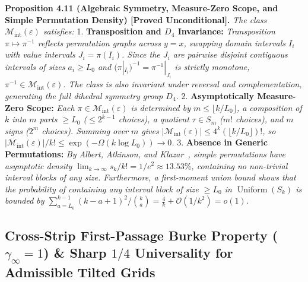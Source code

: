 \documentclass[
  11pt,
]{article}
\begin{document}
\textbf{Proposition 4.11 (Algebraic Symmetry, Measure-Zero Scope, and Simple Permutation Density) [Proved Unconditional].} \emph{The class
\(\mathcal{M}_{\mathrm{int}}(\varepsilon)\) satisfies:} 1.
\textbf{Transposition and \(D_4\) Invariance:} \emph{Transposition
\(\pi \mapsto \pi^{-1}\) reflects permutation graphs across \(y = x\),
swapping domain intervals \(I_i\) with value intervals
\(J_i = \pi(I_i)\). Since the \(J_i\) are pairwise disjoint contiguous
intervals of sizes \(a_i \ge L_0\) and
\((\pi|_{I_i})^{-1} = \pi^{-1}|_{J_i}\) is strictly monotone,
\(\pi^{-1} \in \mathcal{M}_{\mathrm{int}}(\varepsilon)\). The class is
also invariant under reversal and complementation, generating the full
dihedral symmetry group \(D_4\).} 2. \textbf{Asymptotically Measure-Zero
Scope:} \emph{Each \(\pi \in \mathcal{M}_{\mathrm{int}}(\varepsilon)\)
is determined by \(m \le \lfloor k/L_0 \rfloor\), a composition of \(k\)
into \(m\) parts \(\ge L_0\) (\(\le 2^{k-1}\) choices), a quotient
\(\tau \in S_m\) (\(m!\) choices), and \(m\) signs (\(2^m\) choices).
Summing over \(m\) gives
\(|\mathcal{M}_{\mathrm{int}}(\varepsilon)| \le 4^k (\lfloor k/L_0 \rfloor)!\),
so
\(|\mathcal{M}_{\mathrm{int}}(\varepsilon)|/k! \le \exp(-\Omega(k \log L_0)) \to 0\).} 3. \textbf{Absence in Generic
Permutations:} \emph{By Albert, Atkinson, and Klazar~\cite{ref-Albert03}, simple
permutations have asymptotic density
\(\lim_{k \to \infty} s_k/k! = 1/e^2 \approx 13.53\%\), containing no
non-trivial interval blocks of any size. Furthermore, a first-moment
union bound shows that the probability of containing any interval block
of size \(\ge L_0\) in \(\operatorname{Uniform}(S_k)\) is bounded by
\(\sum_{a=L_0}^{k-1} (k-a+1)^2 / \binom{k}{a} = \frac{4}{k} + \mathcal{O}(1/k^2) = o(1)\).}

\subsection{\texorpdfstring{Cross-Strip First-Passage Burke Property (\(\gamma_\infty = 1\)) \& Sharp \(1/4\) Universality for Admissible Tilted Grids}{Cross-Strip First-Passage Burke Property (\textbackslash gamma\_\textbackslash infty = 1) \& Sharp 1/4 Universality for Admissible Tilted Grids}}\label{sec:w36-burke-tilted-grids}
\end{document}
